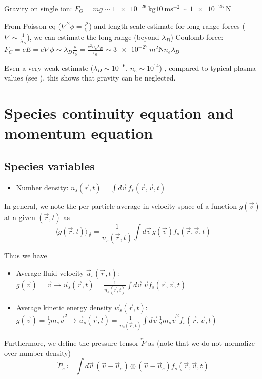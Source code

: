 Gravity on single ion: $F_G = m g \sim \SI{1e-26}{\kilo\gram} \SI{10}{\meter\second^{-2}} \sim \SI{1e-25}{\newton}$


From Poisson eq ($\nabla^2 \phi = \frac{\rho}{\epsilon_0}$) and length scale estimate for long range forces ($\nabla \sim \frac{1}{\lambda_D}$), we can estimate the 
long-range (beyond $\lambda_D$) Coulomb force: $F_C = e E = e \nabla \phi \sim \lambda_D \frac{\rho}{\epsilon_0} = \frac{e^2 n_e \lambda_D}{\epsilon_0} \sim \SI{3e-27}{m^2 \newton} n_e \lambda_D$

Even a very weak estimate ($\lambda_D \sim 10^{-6}$, $n_e \sim 10^{14}$) , compared to typical plasma values (see \cite{Blandford2013}), this shows that gravity can be neglected.

\section{Species continuity equation and momentum equation}
\subsection{Species variables}
\begin{itemize}
    \item Number density: $n_s(\vec{r}, t) = \int d\vec{v} \, f_s(\vec{r},\vec{v},t)$
\end{itemize}
In general, we note the per particle average in velocity space of a function $g(\vec{v})$ at a given $(\vec{r},t)$ as
\begin{equation}
    \langle g(\vec{r},t)\rangle_{\vec{v}} = \frac{1}{n_s(\vec{r}, t)} \int d\vec{v} \, g(\vec{v}) f_s(\vec{r},\vec{v},t)
\end{equation}

Thus we have 

\begin{itemize}
    \item Average fluid velocity $\vec{u}_s(\vec{r},t)$: $g(\vec{v})=\vec{v} \rightarrow \vec{u}_s(\vec{r},t) =\frac{1}{n_s(\vec{r}, t)} \int d\vec{v} \, \vec{v} f_s(\vec{r},\vec{v},t)$
    \item Average kinetic energy density $\vec{w}_s(\vec{r},t)$: $g(\vec{v})=\frac{1}{2}m_s\vec{v}^2 \rightarrow \vec{u}_s(\vec{r},t) =\frac{1}{n_s(\vec{r}, t)} \int d\vec{v} \, \frac{1}{2}m_s\vec{v}^2 f_s(\vec{r},\vec{v},t)$
\end{itemize}

Furthermore, we define the pressure tensor $\overleftrightarrow{P}$ as (note that we do not normalize over number density)
\[ \overleftrightarrow{P}_s \coloneq \int d\vec{v} \, (\vec{v}-\vec{u}_s) \otimes (\vec{v}-\vec{u}_s) f_s(\vec{r},\vec{v},t)
\]

